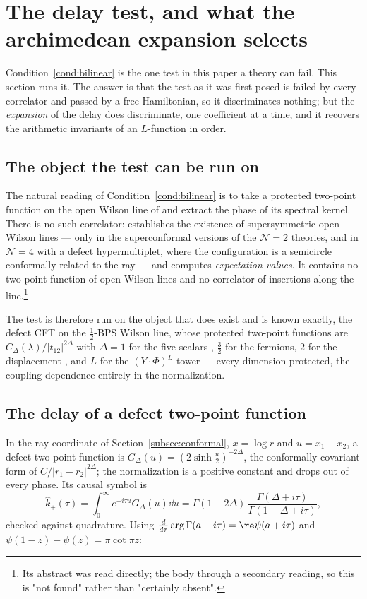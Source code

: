 \section{The delay test, and what the archimedean expansion selects}
\label{sec:delay}

Condition~\ref{cond:bilinear} is the one test in this paper a theory can fail.
This section runs it. The answer is that the test as it was first posed is failed
by every correlator and passed by a free Hamiltonian, so it discriminates nothing;
but the \emph{expansion} of the delay does discriminate, one coefficient at a
time, and it recovers the arithmetic invariants of an $L$-function in order.

\subsection{The object the test can be run on}

The natural reading of Condition~\ref{cond:bilinear} is to take a protected
two-point function on the open Wilson line of \cite{OWL} and extract the phase of
its spectral kernel. There is no such correlator: \cite{OWL} establishes the
existence of supersymmetric open Wilson lines --- only in the superconformal
versions of the $\mathcal N=2$ theories, and in $\mathcal N=4$ with a defect
hypermultiplet, where the configuration is a semicircle conformally related to the
ray --- and computes \emph{expectation values}. It contains no two-point function
of open Wilson lines and no correlator of insertions along the line.\footnote{Its
abstract was read directly; the body through a secondary reading, so this is
"not found" rather than "certainly absent".}

The test is therefore run on the object that does exist and is known exactly, the
defect CFT on the $\frac12$-BPS Wilson line, whose protected two-point functions
are $C_\Delta(\lambda)/|t_{12}|^{2\Delta}$ with $\Delta=1$ for the five scalars
\cite{GRT}, $\frac32$ for the fermions, $2$ for the displacement
\cite{CHMS}, and $L$ for the $(Y\!\cdot\!\Phi)^L$ tower \cite{GiombiKomatsu} ---
every dimension protected, the coupling dependence entirely in the normalization.

\subsection{The delay of a defect two-point function}

In the ray coordinate of Section~\ref{subsec:conformal}, $x=\log r$ and
$u=x_1-x_2$, a defect two-point function is
$G_\Delta(u)=(2\sinh\frac u2)^{-2\Delta}$, the conformally covariant form of
$C/|r_1-r_2|^{2\Delta}$; the normalization is a positive constant and drops out of
every phase. Its causal symbol is
\begin{equation}\label{eq:defectsymbol}
 \widehat k_+(\tau)=\int_0^\infty e^{-i\tau u}G_\Delta(u)\dd u
 =\Gamma(1-2\Delta)\,\frac{\Gamma(\Delta+i\tau)}{\Gamma(1-\Delta+i\tau)} ,
\end{equation}
checked against quadrature. Using
$\frac{d}{d\tau}\arg\Gamma(a+i\tau)=\re\psi(a+i\tau)$ and
$\psi(1-z)-\psi(z)=\pi\cot\pi z$:


